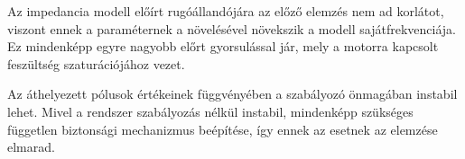 Az impedancia modell előírt rugóállandójára az előző elemzés nem ad korlátot, viszont 
ennek a paraméternek a növelésével növekszik a modell sajátfrekvenciája. Ez mindenképp 
egyre nagyobb előrt gyorsulással jár, mely a motorra kapcsolt feszültség szaturációjához vezet.

Az áthelyezett pólusok értékeinek függvényében a szabályozó önmagában instabil lehet. Mivel a rendszer szabályozás 
nélkül instabil, mindenképp szükséges független biztonsági mechanizmus beépítése, így ennek az esetnek az elemzése elmarad. 
